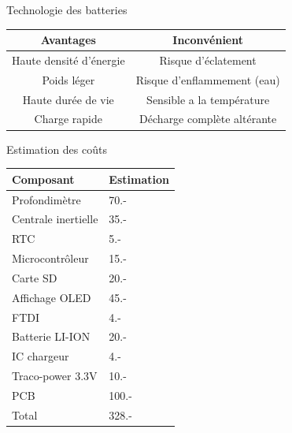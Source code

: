 \documentclass[compress,aspectratio=169]{beamer}
\begin{document}
\begin{frame}[containsverbatim]{Technologie des batteries}
	\par
	\begin{tabular}{c|c}
		Avantages &  Inconvénient\\
		\hline
		Haute densité d'énergie & Risque d'éclatement \\
		Poids léger & Risque d'enflammement (eau) \\ 
		Haute durée de vie & Sensible a la température \\
		Charge rapide & Décharge complète altérante \\
	\end{tabular}
	\par
\end{frame}

\begin{frame}[containsverbatim]{Estimation des coûts}
	\begin{center}
		\begin{tabular}{l|l}
			Composant & Estimation \\
			\hline
			Profondimètre & 70.- \\
			Centrale inertielle & 35.- \\
			RTC & 5.- \\
			Microcontrôleur & 15.- \\
			Carte SD & 20.- \\
			Affichage OLED & 45.- \\
			FTDI & 4.- \\
			Batterie LI-ION & 20.- \\
			IC chargeur & 4.- \\
			Traco-power 3.3V & 10.- \\
			PCB & 100.- \\
			\hline
			\hline
			\vspace{+5pt}Total & 328.-
		\end{tabular} 
	\end{center}
\end{frame}
\end{document}
